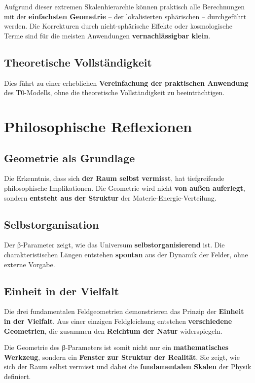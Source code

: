 \documentclass[12pt,a4paper]{report}
\begin{document}
	Aufgrund dieser extremen Skalenhierarchie können praktisch alle Berechnungen mit der \textbf{einfachsten Geometrie} -- der lokalisierten sphärischen -- durchgeführt werden. Die Korrekturen durch nicht-sphärische Effekte oder kosmologische Terme sind für die meisten Anwendungen \textbf{vernachlässigbar klein}.
	
	\subsection{Theoretische Vollständigkeit}
	
	Dies führt zu einer erheblichen \textbf{Vereinfachung der praktischen Anwendung} des T0-Modells, ohne die theoretische Vollständigkeit zu beeinträchtigen.
	
	\section{Philosophische Reflexionen}
	
	\subsection{Geometrie als Grundlage}
	
	Die Erkenntnis, dass sich \textbf{der Raum selbst vermisst}, hat tiefgreifende philosophische Implikationen. Die Geometrie wird nicht \textbf{von außen auferlegt}, sondern \textbf{entsteht aus der Struktur} der Materie-Energie-Verteilung.
	
	\subsection{Selbstorganisation}
	
	Der β-Parameter zeigt, wie das Universum \textbf{selbstorganisierend} ist. Die charakteristischen Längen entstehen \textbf{spontan} aus der Dynamik der Felder, ohne externe Vorgabe.
	
	\subsection{Einheit in der Vielfalt}
	
	Die drei fundamentalen Feldgeometrien demonstrieren das Prinzip der \textbf{Einheit in der Vielfalt}. Aus einer einzigen Feldgleichung entstehen \textbf{verschiedene Geometrien}, die zusammen den \textbf{Reichtum der Natur} widerspiegeln.
	
	Die Geometrie des β-Parameters ist somit nicht nur ein \textbf{mathematisches Werkzeug}, sondern ein \textbf{Fenster zur Struktur der Realität}. Sie zeigt, wie sich der Raum selbst vermisst und dabei die \textbf{fundamentalen Skalen} der Physik definiert.
\end{document}
